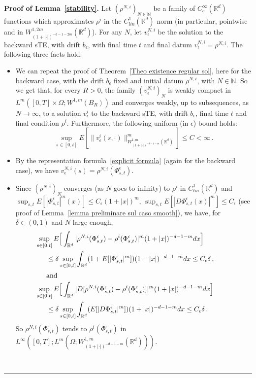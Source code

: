 \documentclass[a4paper,10pt]{article}
\newenvironment{proof}[1][Proof]{\noindent\textbf{#1.} }{\ \rule{0.5em}{0.5em}}
\newcommand{\mr}{\mathbb{R}}
\newcommand{\eps}{\epsilon}
\begin{document}
\begin{proof}[Proof of Lemma~\ref{stability}]
Let $(\rho^{N,i})_{N\in\mathbb{N}}$ be a family of $C^\infty_c(\mr^d)$ functions which approximates $\rho^i$ in the $C^1_{lin}(\mr^d)$ norm (in particular, pointwise and in $W^{1,2m}_{(1+|\cdot|)^{-d-1-2m}}(\mr^d)$). For any $N$, let $v^{N,i}_\eps$ be the solution to the backward sTE, with drift $b_\eps$, with final time $t$ and final datum $v_t^{N,i}=\rho^{N,i}$. The following three facts hold:
\begin{itemize}
\item We can repeat the proof of Theorem~\ref{Theo existence regular sol}, here for the backward case, with the drift $b_\eps$ fixed and initial datum $\rho^{N,i}$, with $N \in \mathbb{N}$. So we get that, for every $R>0$, the family $(v^{N,i}_\eps)_N$ is weakly compact in $L^m([0,T]\times\Omega;W^{1,m}(B_R))$ and converges weakly, up to subsequences, as $N\rightarrow\infty$, to a solution $v^{i}_\eps$ to the backward sTE, with drift $b_\eps$, final time $t$ and final condition $\rho^i$. Furthermore, the following uniform (in $\eps$) bound holds:
\begin{equation}
\sup_{s\in[0,t]}E[\|v^{i}_\eps(s,\cdot)\|^m_{W^{1,m}_{(1+|\cdot|)^{-d-1-m}}(\mr^d)}]\le C<\infty \,.\label{unifboundste}
\end{equation}
\item By the representation formula~\eqref{explicit formula} (again for the backward case), we have $v^{N,i}_\eps(s)=\rho^{N,i}(\Phi^\eps_{s,t})$.
\item Since $(\rho^{N,i})_N$ converges (as $N$ goes to infinity) to $\rho^i$ in $C^1_{lin}(\mr^d)$ and $\sup_{s,t}E[|\Phi^\eps_{s,t}|^m(x)]\le C_\eps(1+|x|)^m$, $\sup_{s,t}E[|D\Phi^\eps_{s,t}(x)|^m]\le C_\eps$ (see proof of Lemma~\ref{lemma preliminare sul caso smooth}), we have, for $\delta \in (0,1)$ and $N$ large enough,
\begin{align*}
\lefteqn{\hspace{-0.5cm}\sup_{s\in[0,t]}E\Big[\int_{\mr^d}|\rho^{N,i}(\Phi^\eps_{s,t})-\rho^i(\Phi^\eps_{s,t})|^m(1+|x|)^{-d-1-m}dx\Big] }\\
& \le \delta\sup_{s\in[0,t]}\int_{\mr^d}(1+E[|\Phi^\eps_{s,t}|^m])(1+|x|)^{-d-1-m}dx\le C_\eps\delta \,,\\
\intertext{and}
\lefteqn{\hspace{-0.5cm}\sup_{s\in[0,t]}E\Big[\int_{\mr^d}|D[\rho^{N,i}(\Phi^\eps_{s,t})-\rho^i(\Phi^\eps_{s,t})]|^m(1+|x|)^{-d-1-m}dx\Big] }\\
& \le \delta\sup_{s\in[0,t]}\int_{\mr^d}(E[|D\Phi^\eps_{s,t}|^m])(1+|x|)^{-d-1-m}dx\le C_\eps\delta \,.
\end{align*}
So $\rho^{N,i}(\Phi^\eps_{s,t})$ tends to $\rho^{i}(\Phi^\eps_{s,t})$ in $L^\infty([0,T];L^m(\Omega;W^{1,m}_{(1+|\cdot|)^{-d-1-m}}(\mr^d)))$.
\end{itemize}


\end{proof}
\end{document}

